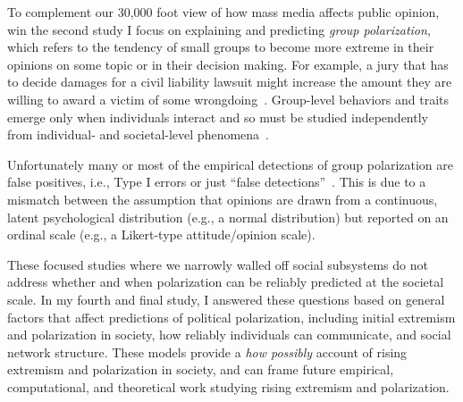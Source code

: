 \documentclass[12pt,letterpaper]{article}
\begin{document}
To complement our 30,000 foot view of how mass media affects public opinion,
win the second study I focus on explaining and predicting \emph{group polarization},
which refers to the tendency of small groups to become more extreme in their
opinions on some topic or in their decision making. For example, a jury that
has to decide damages for a civil liability lawsuit might increase the amount
they are willing to award a victim of some wrongdoing~\cite{Schkade2000}.
Group-level behaviors and traits emerge only when individuals interact
and so must be studied independently from individual- and societal-level
phenomena~\cite{Goldstone2008,Smaldino2014}.

Unfortunately many or most of the empirical detections of group polarization
are false positives, i.e., Type I errors or just
``false detections''~\cite{Turner2021a}. This is due to a mismatch between 
the assumption that opinions are drawn from a continuous, latent psychological
distribution (e.g., a normal distribution) but reported on an ordinal
scale (e.g., a Likert-type attitude/opinion scale).

These focused studies where we narrowly walled off social subsystems do not
address whether and when polarization can be reliably predicted at the
societal scale. In my fourth and final study, I answered these questions
based on general factors that affect predictions of political polarization, 
including initial extremism and polarization in society, how reliably individuals
can communicate, and social network structure. These models provide a
\emph{how possibly} account of rising extremism and polarization in society,
and can frame future empirical, computational, and theoretical work 
studying rising extremism and polarization.
\end{document}
